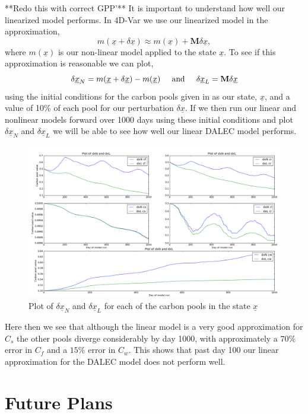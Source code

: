\documentclass[11pt]{article}
\begin{document}
**Redo this with correct GPP'**
It is important to understand how well our linearized model performs. In 4D-Var we use our linearized model in the approximation,
\[ m(\underline{x}+\delta \underline{x}) \approx m(\underline{x}) +\textbf{M}\delta \underline{x}, \]
where $m(\underline{x})$ is our non-linear model applied to the state $\underline{x}$. To see if this approximation is reasonable we can plot,
\[ \delta\underline{x}_N = m(\underline{x} + \delta\underline{x})-m(\underline{x})
 \hspace{5mm} \text{and} \hspace{5mm}
 \delta\underline{x}_L = \textbf{M}\delta \underline{x} \]
using the initial conditions for the carbon pools given in \cite{williams2005improved} as our state, $\underline{x}$, and a value of 10\% of each pool for our perturbation $\delta\underline{x}$. If we then run our linear and nonlinear models forward over 1000 days using these initial conditions and plot $\delta\underline{x}_N$ and $\delta\underline{x}_L$ we will be able to see how well our linear DALEC model performs.
\begin{figure}[ht]
\centering
\includegraphics[width=1\textwidth]{dxNdxLCpoolsubplot2.png}
\caption{Plot of $\delta\underline{x}_N$ and $\delta\underline{x}_L$ for each of the carbon pools in the state $\underline{x}$}
\label{fig:dx_subplot}
\end{figure}
Here then we see that although the linear model is a very good approximation for $C_s$ the other pools diverge considerably by day 1000, with approximately a $70\%$ error in $C_f$ and a $15\%$ error in $C_w$. This shows that past day 100 our linear approximation for the DALEC model does not perform well.

\section*{Future Plans}
\end{document}
